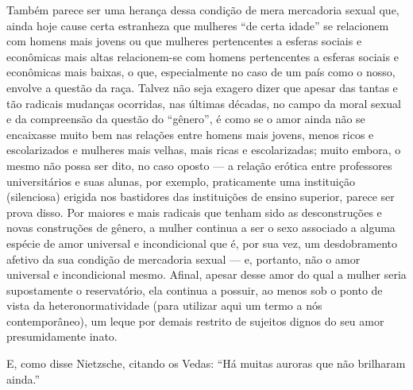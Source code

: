 Também parece ser uma herança dessa condição de mera mercadoria sexual
que, ainda hoje cause certa estranheza que mulheres ``de certa idade''
se relacionem com homens mais jovens ou que mulheres pertencentes a
esferas sociais e econômicas mais altas relacionem-se com homens
pertencentes a esferas sociais e econômicas mais baixas, o que,
especialmente no caso de um país como o nosso, envolve a questão da
raça. Talvez não seja exagero dizer que apesar das tantas e tão radicais
mudanças ocorridas, nas últimas décadas, no campo da moral sexual e da
compreensão da questão do ``gênero'', é como se o amor ainda não se
encaixasse muito bem nas relações entre homens mais jovens, menos ricos
e escolarizados e mulheres mais velhas, mais ricas e escolarizadas;
muito embora, o mesmo não possa ser dito, no caso oposto --- a relação
erótica entre professores universitários e suas alunas, por exemplo,
praticamente uma instituição (silenciosa) erigida nos bastidores das
instituições de ensino superior, parece ser prova disso. Por maiores e
mais radicais que tenham sido as desconstruções e novas construções de
gênero, a mulher continua a ser o sexo associado a alguma espécie de
amor universal e incondicional que é, por sua vez, um desdobramento
afetivo da sua condição de mercadoria sexual --- e, portanto, não o amor
universal e incondicional mesmo. Afinal, apesar desse amor do qual a
mulher seria supostamente o reservatório, ela continua a possuir, ao
menos sob o ponto de vista da heteronormatividade (para utilizar aqui um
termo a nós contemporâneo), um leque por demais restrito de sujeitos
dignos do seu amor presumidamente inato.

E, como disse Nietzsche, citando os Vedas: ``Há muitas auroras que não
brilharam ainda.''

